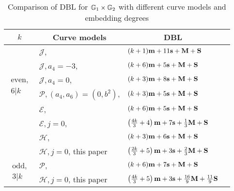 \begin{table}[h]
\centering
\caption{Comparison of DBL for $\mathbb{G}_{1} \times \mathbb{G}_{2}$ with different curve models and embedding degrees}

\begin{tabular}{| l | l | l | l}
\hline
\multicolumn{1}{|c|}{$k$}
&\multicolumn{1}{|c|}{Curve models}	&\multicolumn{1}{c|}{DBL}		\\
\hline
\multicolumn{1}{|c|}{\multirow{6}{*}{
$\begin{array}{c} \text{even,} \\ 6|k \end{array}$}}
&$\mathcal{J}$, \cite{2008/IonicaJoux08} \cite{2009/fastertate}
				&$(k + 1)\textbf{m} + 11\textbf{s} + \textbf{M} + \textbf{S}$		\\
&$\mathcal{J},a_4 = -3$, \cite{2009/fastertate}
				&$(k + 6)\textbf{m} + 5\textbf{s} + \textbf{M} + \textbf{S}$	\\
&$\mathcal{J},a_4 = 0$, \cite{2009/fastertate}		
				&$(k + 3)\textbf{m} + 8\textbf{s} + \textbf{M} + \textbf{S}$		\\
&$\mathcal{P},(a_4,a_6) = (0, b^2)$, \cite{2009/craig}
				&$(k + 3)\textbf{m} + 5\textbf{s} + \textbf{M} + \textbf{S}$		\\
&$\mathcal{E}$, \cite{2009/fastertate}			
				&$(k + 6)\textbf{m} + 5\textbf{s} + \textbf{M} + \textbf{S}$			\\
&$\mathcal{E},j=0$, \cite{2012/LWZ}
				&$\left(\frac{4k}{3}+ 4\right)\textbf{m} + 7\textbf{s}  + \frac{1}{3}\textbf{M} + \textbf{S}$\\
&$\mathcal{H}$, \cite{2010/Gu}	&$(k + 3)\textbf{m} + 6\textbf{s} + \textbf{M} + \textbf{S}$ 	\\
&$\mathcal{H},j=0$, this paper 	&
$ \left(\frac{2k}{3} + 5\right)\textbf{m} + 3\textbf{s} + \frac{2}{3}\textbf{M} + \textbf{S}$			\\
\hline
\multicolumn{1}{|c|}{\multirow{2}{*}{
$\begin{array}{c} \text{odd,} \\ 3|k \end{array}$}}
&$\mathcal{P}$, \cite{2010/CLN}	&$(k + 6)\textbf{m} + 7\textbf{s} + \textbf{M} + \textbf{S}$		\\
&$\mathcal{H},j=0$, this paper
&$ \left(\frac{4k}{3} + 5\right)\textbf{m} + 3\textbf{s} + \frac{16}{9}\textbf{M} + \frac{11}{9}\textbf{S}$
\\
\hline
\end{tabular}
\label{tbl-cmp1}


\end{table}

